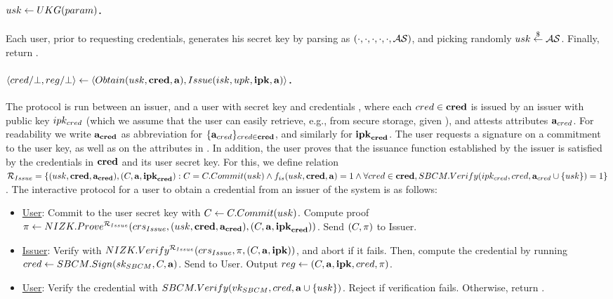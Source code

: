 \paragraph{$usk \gets UKG(param)$.} %
Each user, prior to requesting credentials, generates his secret key by parsing
\parm as $(\cdot,\cdot,\cdot,\cdot,\cdot,\mathcal{AS})$, and picking randomly
$usk \stackrel{\$}{\gets} \mathcal{AS}$. Finally, return \usk.

\paragraph{$\langle cred/\bot,reg/\bot \rangle \gets
  \langle Obtain(usk,\mathbf{cred},\mathbf{a}),Issue(isk,upk,\mathbf{ipk},\mathbf{a})\rangle$.} %
The protocol is run between an issuer, and a user with secret key \usk and
credentials \scred, where each $cred \in \mathbf{cred}$ is issued by an issuer with
public key $ipk_{cred}$ (which we assume that the user can easily retrieve,
e.g., from secure storage, given \cred), and attests attributes
$\mathbf{a}_{cred}$. For readability we write $\mathbf{a}_{\mathbf{cred}}$ as abbreviation for
$\lbrace \mathbf{a}_{cred} \rbrace_{cred \in \mathbf{cred}}$, and similarly for
$\mathbf{ipk}_{\mathbf{cred}}$. The user requests a signature on a commitment to the user key,
as well as on the attributes in \attrs. In addition, the user proves that the
issuance function \fissue established by the issuer is satisfied by the
credentials in $\mathbf{cred}$
and its user secret key. For this, we define relation $\mathcal{R}_{Issue} = \lbrace
(usk,\mathbf{cred},\mathbf{a}_{\mathbf{cred}}), (C,\mathbf{a},\mathbf{ipk}_{\mathbf{cred}}): C = C.Commit(usk) \land
f_{is}(usk,\mathbf{cred},\mathbf{a}) = 1 \land \forall cred \in \mathbf{cred},
SBCM.Verify(ipk_{cred},cred,
\mathbf{a}_{cred} \cup \lbrace usk \rbrace) = 1 \rbrace$. The interactive protocol
for a user to obtain a credential from an issuer of the system is as follows:

\begin{itemize}
\item \uline{User}: Commit to the user secret key with $C \gets
  C.Commit(usk)$. Compute proof $\pi \gets
  NIZK.Prove^{\mathcal{R}_{Issue}}(crs_{Issue},(usk,\mathbf{cred},\mathbf{a}_{\mathbf{cred}}),
  (C,\mathbf{a},\mathbf{ipk}_{\mathbf{cred}}))$. Send $(C,\pi)$ to Issuer.
\item \uline{Issuer}: Verify \NIZKproof with $NIZK.Verify^{\mathcal{R}_{Issue}}
  (crs_{Issue},\pi,(C,\mathbf{a},\mathbf{ipk}))$, and abort if it fails. Then,
  compute the credential by running $cred \gets SBCM.Sign(sk_{SBCM},C,
  \mathbf{a})$. Send \cred to User. Output $reg \gets (C,\mathbf{a},\mathbf{ipk},
  cred,\pi)$.
\item \uline{User}: Verify the credential with $SBCM.Verify(vk_{SBCM},cred,
  \mathbf{a} \cup \lbrace usk \rbrace)$. Reject if verification fails.
  Otherwise, return \cred.
\end{itemize}

